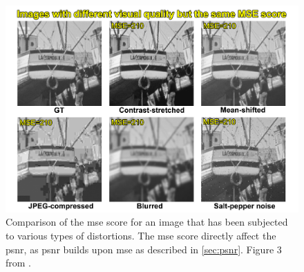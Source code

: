 \begin{figure}[ht]
    \centering
    \includegraphics[width=1.0\textwidth]{figures/psnr-critique.png}
    \caption[PSNR critique]{Comparison of the \acrshort{mse} score for an image that has been subjected to various types of distortions. The \acrshort{mse} score directly affect the \acrshort{psnr}, as \acrshort{psnr} builds upon \acrshort{mse} as described in \autoref{sec:psnr}. Figure 3 from \cite{vpqrg}.}
    \label{fig:psnr-critique}
\end{figure}